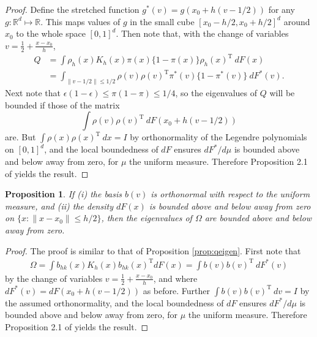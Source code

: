 \documentclass[11pt,twoside]{article}
\def\T{{ \mathrm{\scriptscriptstyle T} }}
\newcommand{\R}{\mathbb{R}}
\newtheorem{propositionapp}{Proposition}
\theoremstyle{definition}
\theoremstyle{remark}
\begin{document}
\bigskip

\begin{proof}
Define the stretched function $g^*(v) = g(x_0 + h(v-1/2))$  for any $g: \R^d \mapsto \R$. This maps values of $g$ in the small cube $[x_0-h/2,x_0+h/2]^d$ around $x_0$ to the whole space $[0,1]^d$. Then note that, with the change of variables $v=\frac{1}{2} + \frac{x-x_0}{h}$, 
\begin{align*}
Q &=  \int \rho_h(x) K_h(x) \pi(x) \{ 1-\pi(x)\} \rho_h(x)^\T \ dF(x)  \\
&= \int_{\|v -1/2\| \leq 1/2} \rho(v)  \rho(v)^\T  \pi^*(v) \{ 1-\pi^*(v)\}\ dF^*(v) .
\end{align*}
Next note that $\epsilon(1-\epsilon) \leq \pi(1-\pi) \leq 1/4$, so  the eigenvalues of $Q$ will be bounded if those of the matrix $$  \int  \rho(v) \rho(v)^\T \ dF(x_0 + h(v-1/2))  $$
are.  But $  \int  \rho(x) \rho(x)^\T \ dx = I$ by orthonormality of the Legendre polynomials on $[0,1]^d$, and  the local boundedness of $dF$ ensures $dF^*/d\mu$ is bounded above and below away from zero, for $\mu$ the uniform measure. Therefore Proposition 2.1 of  \citet{belloni2015some} yields the result. 
\end{proof}

\bigskip

\begin{propositionapp} \label{prop:oeigen}
If (i) the basis $b(v)$ is orthonormal with respect to the uniform measure, and  (ii) the density $dF(x)$ is bounded above and below away from zero on $\{x: \|x-x_0 \| \leq h/2\}$, then the eigenvalues of $\Omega$ are bounded above and below away from zero. 
\end{propositionapp}

\bigskip

\begin{proof}
The proof is similar to that of Proposition \ref{prop:qeigen}. First note that
\begin{align*}
\Omega = \int b_{hk}(x) K_h(x) b_{hk}(x)^\T dF(x) = \int b(v) b(v)^\T \ dF^*(v)
\end{align*}
by the change of variables $v=\frac{1}{2} + \frac{x-x_0}{h}$, and where $dF^*(v) = dF(x_0 + h(v-1/2))$ as before. Further $  \int b(v) b(v)^\T \ dv = I$ by the assumed orthonormality, and the local boundedness of $dF$ ensures $dF^*/d\mu$ is bounded above and below away from zero, for $\mu$ the uniform measure. Therefore Proposition 2.1 of  \citet{belloni2015some} yields the result. 
\end{proof}
\end{document}

